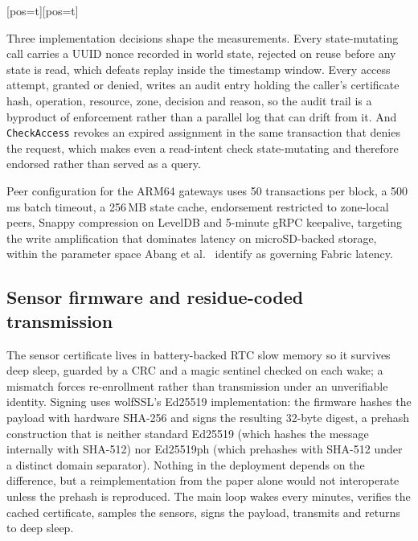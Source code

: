\documentclass[a4paper,fleqn]{cas-dc}
\makeatletter
\newenvironment{widefig}[1][pos=t]
  {\ifdoublecol \@nameuse{figure*}[#1]\else \@nameuse{figure}[#1]\fi}
  {\ifdoublecol \@nameuse{endfigure*}\else \@nameuse{endfigure}\fi}
\makeatother
\begin{document}
\begin{widefig}
\caption{Access control within the Fabric execute-order-validate transaction flow.}
\label{fig:flow}
\end{widefig}

Three implementation decisions shape the measurements. Every state-mutating
call carries a UUID nonce recorded in world state, rejected on reuse before
any state is read, which defeats replay inside the timestamp window. Every
access attempt, granted or denied, writes an audit entry holding the caller's
certificate hash, operation, resource, zone, decision and reason, so the
audit trail is a byproduct of enforcement rather than a parallel log that can
drift from it. And \texttt{CheckAccess} revokes an expired assignment in the
same transaction that denies the request, which makes even a read-intent
check state-mutating and therefore endorsed rather than served as a query.

Peer configuration for the ARM64 gateways uses 50 transactions per block, a
500\,ms batch timeout, a 256\,MB state cache, endorsement restricted to
zone-local peers, Snappy compression on LevelDB and 5-minute gRPC keepalive,
targeting the write amplification that dominates latency on microSD-backed
storage, within the parameter space Abang et al.\ \cite{abang2024latency}
identify as governing Fabric latency.

\subsection{Sensor firmware and residue-coded transmission}
\label{subsec:firmware}

The sensor certificate lives in battery-backed RTC slow memory so it
survives deep sleep, guarded by a CRC and a magic sentinel checked on each
wake; a mismatch forces re-enrollment rather than transmission under an
unverifiable identity. Signing uses wolfSSL's Ed25519 implementation: the
firmware hashes the payload with hardware SHA-256 and signs the resulting
32-byte digest, a prehash construction that is neither standard Ed25519
(which hashes the message internally with SHA-512) nor Ed25519ph (which
prehashes with SHA-512 under a distinct domain separator). Nothing in the
deployment depends on the difference, but a reimplementation from the
paper alone would not interoperate unless the prehash is reproduced. The
main loop wakes every \DutyCycleMinutes{} minutes, verifies the cached
certificate, samples the sensors, signs the payload, transmits and returns
to deep sleep.
\end{document}
